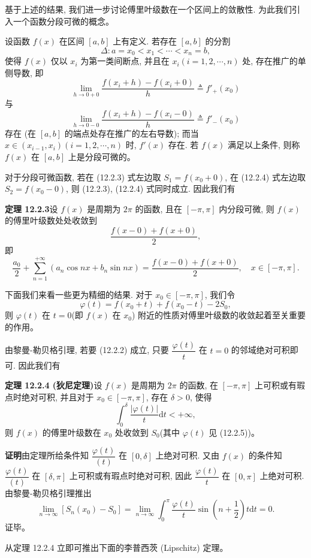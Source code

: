 \documentclass[UTF8, 12pt, fontset=fandol, oneside]{ctexart}
\begin{document}
基于上述的结果, 我们进一步讨论傅里叶级数在一个区间上的敛散性. 为此我们引入一个函数分段可微的概念。

设函数 $f(x)$ 在区间 $[a,b]$ 上有定义. 若存在 $[a,b]$ 的分割
\[
  \Delta: a=x_0<x_1<\cdots<x_n=b,
\]
使得 $f(x)$ 仅以 $x_i$ 为第一类间断点, 并且在 $x_i(i=1,2,\cdots,n)$ 处, 存在推广的单侧导数, 即
\[
  \lim_{h\to0+0}\frac{f(x_i+h)-f(x_i+0)}{h}\triangleq f'_+(x_0)
\]
与
\[
  \lim_{h\to0-0}\frac{f(x_i+h)-f(x_i-0)}{h}\triangleq f'_-(x_0)
\]
存在 (在 $[a,b]$ 的端点处存在推广的左右导数); 而当 $x\in(x_{i-1},x_i)(i=1,2,\cdots,n)$ 时, $f'(x)$ 存在. 若 $f(x)$ 满足以上条件, 则称 $f(x)$ 在 $[a,b]$ 上是分段可微的。

对于分段可微函数, 若在 (12.2.3) 式左边取 $S_1=f(x_0+0)$, 在 (12.2.4) 式左边取 $S_2=f(x_0-0)$, 则 (12.2.3), (12.2.4) 式同时成立. 因此我们有

\noindent\textbf{定理 12.2.3}\quad 设 $f(x)$ 是周期为 $2\pi$ 的函数, 且在 $[-\pi,\pi]$ 内分段可微, 则 $f(x)$ 的傅里叶级数处处收敛到
\[
  \frac{f(x-0)+f(x+0)}{2},
\]
即
\[
  \frac{a_0}{2}+\sum_{n=1}^{+\infty}(a_n\cos nx+b_n\sin nx)
  =
  \frac{f(x-0)+f(x+0)}{2},
  \quad x\in[-\pi,\pi].
\]

下面我们来看一些更为精细的结果. 对于 $x_0\in[-\pi,\pi]$, 我们令
\begin{equation}
  \varphi(t)=f(x_0+t)+f(x_0-t)-2S_0,
  \tag{12.2.5}
\end{equation}
则 $\varphi(t)$ 在 $t=0$(即 $f(x)$ 在 $x_0$) 附近的性质对傅里叶级数的收敛起着至关重要的作用。

由黎曼-勒贝格引理, 若要 (12.2.2) 成立, 只要 $\dfrac{\varphi(t)}{t}$ 在 $t=0$ 的邻域绝对可积即可. 因此我们有

\noindent\textbf{定理 12.2.4 (狄尼定理)}\quad 设 $f(x)$ 是周期为 $2\pi$ 的函数, 在 $[-\pi,\pi]$ 上可积或有瑕点时绝对可积, 并且对于 $x_0\in[-\pi,\pi]$, 存在 $\delta>0$, 使得
\[
  \int_0^\delta\frac{|\varphi(t)|}{t}\mathrm dt<+\infty,
\]
则 $f(x)$ 的傅里叶级数在 $x_0$ 处收敛到 $S_0$(其中 $\varphi(t)$ 见 (12.2.5))。

\noindent\textbf{证明}\quad 由定理所给条件知 $\dfrac{\varphi(t)}{(t)}$ 在 $[0,\delta]$ 上绝对可积. 又由 $f(x)$ 的条件知 $\dfrac{\varphi(t)}{(t)}$ 在 $[\delta,\pi]$ 上可积或有瑕点时绝对可积, 因此 $\dfrac{\varphi(t)}{t}$ 在 $[0,\pi]$ 上绝对可积. 由黎曼-勒贝格引理推出
\[
  \lim_{n\to\infty}[S_n(x_0)-S_0]
  =\lim_{n\to\infty}\int_0^\pi
  \frac{\varphi(t)}{t}\sin\left(n+\frac12\right)t\mathrm dt=0.
\]
证毕。

从定理 12.2.4 立即可推出下面的李普西茨 (Lipschitz) 定理。
\end{document}
